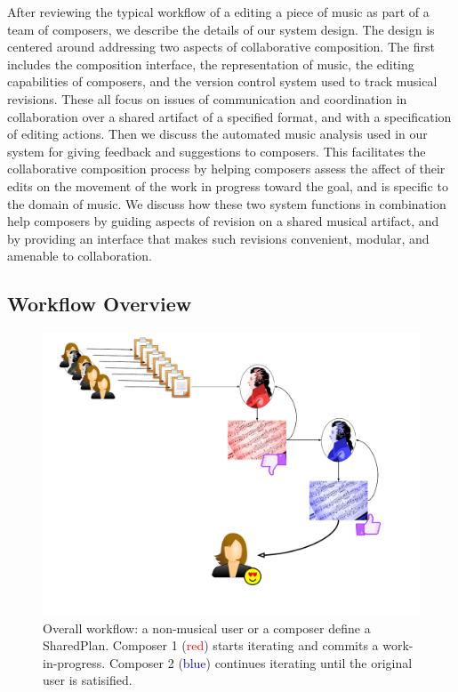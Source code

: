 \documentclass[final,authoryear,5p,times,twocolumn]{elsarticle}
\begin{document}
After reviewing the typical workflow of a editing a piece of music as part of a team of composers, we describe the details of our system design. The design is centered around addressing two aspects of collaborative composition. The first includes the composition interface, the representation of music, the editing capabilities of composers, and the version control system used to track musical revisions. These all focus on issues of communication and coordination in collaboration over a shared artifact of a specified format, and with a specification of editing actions. Then we discuss the automated music analysis used in our system for giving feedback and suggestions to composers. This facilitates the collaborative composition process by helping composers assess the affect of their edits on the movement of the work in progress toward the goal, and is specific to the domain of music. We discuss how these two system functions in combination help composers by guiding aspects of revision on a shared musical artifact, and by providing an interface that makes such revisions convenient, modular, and amenable to collaboration.

\subsection{Workflow Overview}

\begin{figure}
	\includegraphics[scale=0.35]{workflow.pdf}
	\caption{Overall workflow: a non-musical user or a composer define a SharedPlan. Composer 1 (\textcolor{red}{red}) starts
	iterating and commits a work-in-progress. Composer 2 (\textcolor{blue}{blue}) continues iterating until the original user is
	satisified.}
	\label{fig:workflow}
\end{figure}
\end{document}

